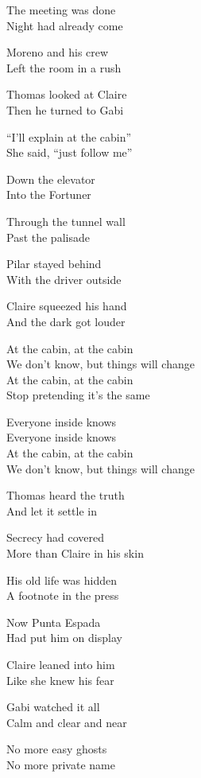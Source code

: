 \begin{lyrics}
The meeting was done\\
Night had already come

Moreno and his crew\\
Left the room in a rush

Thomas looked at Claire\\
Then he turned to Gabi

“I’ll explain at the cabin”\\
She said, “just follow me”

Down the elevator\\
Into the Fortuner

Through the tunnel wall\\
Past the palisade

Pilar stayed behind\\
With the driver outside

Claire squeezed his hand\\
And the dark got louder

At the cabin, at the cabin\\
We don’t know, but things will change\\
At the cabin, at the cabin\\
Stop pretending it’s the same

Everyone inside knows\\
Everyone inside knows\\
At the cabin, at the cabin\\
We don’t know, but things will change

Thomas heard the truth\\
And let it settle in

Secrecy had covered\\
More than Claire in his skin

His old life was hidden\\
A footnote in the press

Now Punta Espada\\
Had put him on display

Claire leaned into him\\
Like she knew his fear

Gabi watched it all\\
Calm and clear and near

No more easy ghosts\\
No more private name


\end{lyrics}
